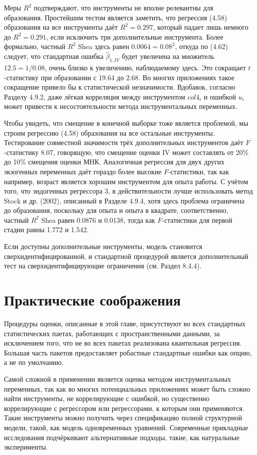 Меры $R^2$ подтверждают, что инструменты не вполне релевантны для образования. Простейшим тестом  является заметить, что регрессия (4.58) образования на все инструменты даёт  $R^2=0.297$, который падает лишь немного до  $R^2=0.291$, если исключить три дополнительные инструмента. Более формально, частный  $R^2$ Shea здесь равен $0.0064 = 0.08^2$, откуда по (4.62) следует, что стандартная ошибка $\hat{\beta}_{1, IV}$ будет увеличена на множитель $12.5 = 1/0.08$, очень близко к увеличению, наблюдаемому здесь. Это сокращает $t$-статистику при образовании с 19.64 до 2.68. Во многих приложениях такое сокращение привело бы к статистической незначимости. Вдобавок, согласно Разделу 4.9.2, даже лёгкая корреляция между инструментом $col4_i$ и ошибкой $u_i$ может привести к несостоятельности метода инструментальных переменных. 

Чтобы увидеть, что смещение в конечной выборке тоже является проблемой, мы строим регрессию (4.58) образования на все остальные инструменты. Тестирование совместной значимости трёх дополнительных инструментов даёт $F$-статистику 8.07, говорящую, что смещение оценки IV может составлять от 20\% до 10\% смещения оценки МНК. Аналогичная регрессия для двух других экзогенных переменных даёт гораздо более высокие  $F$-статистики, так как например, возраст является хорошим инструментом для опыта работы. С учётом того, что эндогенных регрессора 3, в действительности лучше использовать метод Stock и др. (2002), описанный в Разделе 4.9.4, хотя здесь проблема ограничена до образования, поскольку для опыта и опыта в квадрате, соответственно, частный $R^2$ Shea равен 0.0876 и 0.0138, тогда как $F$-статистики для первой стадии равны 1.772 и 1.542.

Если доступны дополнительные инструменты, модель становится сверхидентифицированной, и стандартной процедурой является дополнительный тест на сверхидентифицирующие ограничения (см. Раздел 8.4.4).
 
\section{Практические соображения}

Процедуры оценки, описанные в этой главе, присутствуют во всех стандартных статистических паетах, работающих с пространственными данными, за исключением того, что не во всех пакетах реализована квантильная регрессия. Большая часть пакетов предоставляет робастные стандартные ошибки как опцию, а не по умолчанию.

Самой сложной в применении является оценка методом инструментальных переменных, так как во многих потенциальных приложениях может быть сложно найти инструменты, не коррелирующие с ошибкой, но существенно коррелирующие с регрессором или регрессорами, к которым они применяются. Такие инструменты можно получить через спецификацию полной структурной модели, такой, как модель одновременных уравнений. Современные прикладные исследования подчёркивают альтернативные подходы, такие, как натуральные эксперименты.

